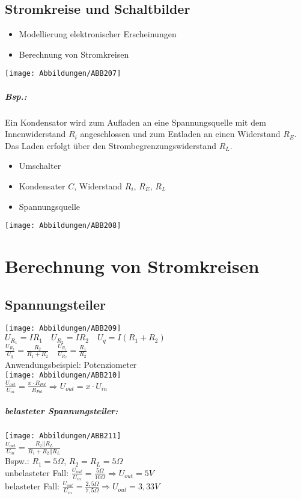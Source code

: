\section{Stromkreise und Schaltbilder}
\begin{itemize}
\item Modellierung elektronischer Erscheinungen
\item Berechnung von Stromkreisen
\end{itemize}
\texttt{[image: Abbildungen/ABB207]}

\paragraph{Bsp.:} Ein Kondensator wird zum Aufladen an eine Spannungsquelle mit dem Innenwiderstand $R_i$ angeschlossen und zum Entladen an einen Widerstand $R_E$. Das Laden erfolgt über den Strombegrenzungswiderstand $R_L$.
\begin{itemize}
\item Umschalter
\item Kondensater $C$, Widerstand $R_i$, $R_E$, $R_L$
\item Spannungsquelle
\end{itemize}
\texttt{[image: Abbildungen/ABB208]}

\chapter{Berechnung von Stromkreisen}

\section{Spannungsteiler}

\texttt{[image: Abbildungen/ABB209]}\\
$U_{R_1}=IR_1 \quad U_{R_2}=IR_2 \quad U_q= I(R_1+R_2)$\\
$\frac{U_{R_2}}{U_q}=\frac{R_2}{R_1+R_2} \quad \frac{U_{R_1}}{U_{R_2}}=\frac{R_1}{R_2}$\\
Anwendungsbeispiel: Potenziometer\\
\texttt{[image: Abbildungen/ABB210]}\\
$\frac{U_{out}}{U_{in}}=\frac{x\cdot R_{Pot}}{R_{Pot}}\Rightarrow U_{out} = x \cdot U_{in}$
\paragraph{belasteter Spannungsteiler:}\parskp
\texttt{[image: Abbildungen/ABB211]}\\
$\frac{U_{out}}{U_{in}}=\frac{R_2||R_L}{R_1+R_2||R_L}$\\
Bspw.: $R_1=5 \Omega$, $R_2=R_L=5 \Omega$\\
unbelasteter Fall: $\frac{U_{out}}{U_{in}}=\frac{5 \Omega}{10 \Omega} \Rightarrow U_{out}=5V$\\
belasteter Fall: $\frac{U_{out}}{U_{in}}=\frac{2,5 \Omega}{7,5 \Omega}\Rightarrow U_{out}=3,33V$

